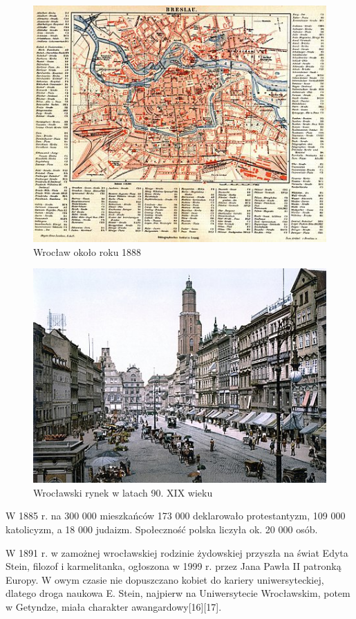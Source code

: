\documentclass{article}
\begin{document}
 \begin{figure}[h!]
\centering
\includegraphics[scale=1]{9.jpg}
\caption{Wrocław około roku 1888}
\end{figure}
 \begin{figure}[h!]
\centering
\includegraphics[scale=0.4]{10.jpg}
\caption{Wrocławski rynek w latach 90. XIX wieku}
\end{figure}



W 1885 r. na 300 000 mieszkańców 173 000 deklarowało protestantyzm, 109 000 katolicyzm, a 18 000 judaizm. Społeczność polska liczyła ok. 20 000 osób.

W 1891 r. w zamożnej wrocławskiej rodzinie żydowskiej przyszła na świat Edyta Stein, filozof i karmelitanka, ogłoszona w 1999 r. przez Jana Pawła II patronką Europy. W owym czasie nie dopuszczano kobiet do kariery uniwersyteckiej, dlatego droga naukowa E. Stein, najpierw na Uniwersytecie Wrocławskim, potem w Getyndze, miała charakter awangardowy[16][17].
\end{document}

